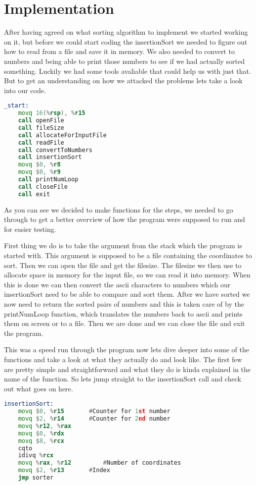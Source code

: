\documentclass{article}
\begin{document}
\section{Implementation}
After having agreed on what sorting algorithm to implement we started working on it, but before we could start coding the insertionSort we needed to figure out how to read from a file and save it in memory. We also needed to convert to numbers and being able to print those numbers to see if we had actually sorted something. Luckily we had some tools avaliable that could help us with just that. But to get an understanding on how we attacked the problems lets take a look into our code.

\begin{lstlisting}[language=asm]
_start:
	movq 16(%rsp), %r15	
	call openFile
	call fileSize
	call allocateForInputFile
	call readFile
	call convertToNumbers
	call insertionSort
	movq $0, %r8	
	movq $0, %r9		
	call printNumLoop
	call closeFile
	call exit
\end{lstlisting}
As you can see we decided to make functions for the steps, we needed to go through to get a better overview of how the program were supposed to run and for easier testing. 

First thing we do is to take the argument from the stack which the program is started with. This argument is supposed to be a file containing the coordinates to sort. Then we can open the file and get the filesize. The filesize we then use to allocate space in memory for the input file, so we can read it into memory. When this is done we can then convert the ascii characters to numbers which our insertionSort need to be able to compare and sort them. After we have sorted we now need to return the sorted pairs of numbers and this is taken care of by the printNumLoop function, which translates the numbers back to ascii and prints them on screen or to a file. Then we are done and we can close the file and exit the program.

This was a speed run through the program now lets dive deeper into some of the functions and take a look at what they actually do and look like. The first few are pretty simple and straightforward and what they do is kinda explained in the name of the function. So lets jump straight to the insertionSort call and check out what goes on here.

\begin{lstlisting}[language=asm]
insertionSort:
	movq $0, %r15		#Counter for 1st number
	movq $2, %r14		#Counter for 2nd number
	movq %r12, %rax
	movq $0, %rdx
	movq $8, %rcx
	cqto
	idivq %rcx
	movq %rax, %r12	        #Number of coordinates
	movq $2, %r13		#Index
	jmp sorter
\end{lstlisting}
\end{document}
